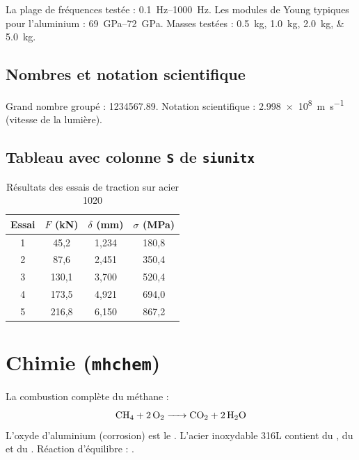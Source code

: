 \documentclass{poly}
\begin{document}
La plage de fréquences testée : \SIrange{0,1}{1000}{\hertz}.
Les modules de Young typiques pour l'aluminium : \SIrange{69}{72}{\giga\pascal}.
Masses testées : \SIlist{0,5 ; 1,0 ; 2,0 ; 5,0}{\kilogram}.

\subsection{Nombres et notation scientifique}

Grand nombre groupé : \num{1234567,89}.
Notation scientifique : \num{2,998e8}~\si{\metre\per\second}
(vitesse de la lumière).

\subsection{Tableau avec colonne \texttt{S} de \texttt{siunitx}}

\begin{table}[!ht]
    \caption{Résultats des essais de traction sur acier 1020}
    \label{tab:mesures}
    \begin{center}
        \begin{tabular}{c
                        S[table-format=3.1]
                        S[table-format=1.3]
                        S[table-format=3.1]}
            \toprule
            Essai &
            {$F$ (\si{\kilo\newton})} &
            {$\delta$ (\si{\milli\metre})} &
            {$\sigma$ (\si{\mega\pascal})} \\
             & 45,2 & 1,234 & 180,8 \\
            2 & 87,6 & 2,451 & 350,4 \\
            3 & 130,1 & 3,700 & 520,4 \\
            4 & 173,5 & 4,921 & 694,0 \\
            5 & 216,8 & 6,150 & 867,2 \\
            \bottomrule
        \end{tabular}
    \end{center}
\end{table}

\section{Chimie (\texttt{mhchem})}

La combustion complète du méthane :
\begin{equation}
    \ce{CH4 + 2 O2 -> CO2 + 2 H2O}
    \label{eq:combustion}
\end{equation}
L'oxyde d'aluminium (corrosion) est le .
L'acier inoxydable 316L contient du , du  et du .
Réaction d'équilibre : .
\end{document}
